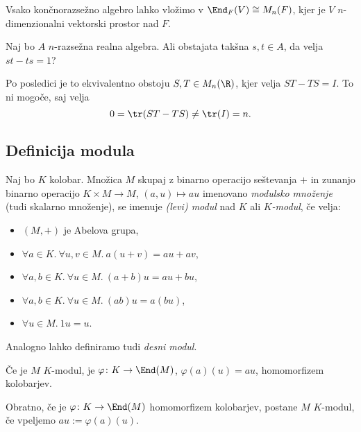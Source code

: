 \begin{posledica}
    Vsako končnorazsežno algebro lahko vložimo v $\End_F(V) \cong M_n(F)$, kjer 
    je $V$ $n$-dimenzionalni vektorski prostor nad $F$.
\end{posledica}

\begin{primer}
    Naj bo $A$ $n$-razsežna realna algebra. Ali obstajata takšna $s, t \in A$, da velja 
    $st - ts = 1$?

    Po posledici je to ekvivalentno obstoju $S, T \in M_n(\R)$, kjer velja $ST - TS = I$.
    To ni mogoče, saj velja
    \[
        0 = \tr(ST - TS) \neq \tr(I) = n.
    \]
\end{primer}

\subsection{Definicija modula}

\begin{definicija}
    Naj bo $K$ kolobar. Množica $M$ skupaj z binarno operacijo seštevanja $+$ in zunanjo
    binarno operacijo $K \times M \to M$, $(a, u) \mapsto au$ imenovano 
    \emph{modulsko množenje} (tudi skalarno množenje), 
    se imenuje \emph{(levi) modul} nad $K$ ali \emph{$K$-modul}, če velja:
    \begin{itemize}
        \item $(M, +)$ je Abelova grupa,
        \item $\forall a \in K.~\forall u, v \in M.~a(u+v)=au + av$,
        \item $\forall a, b \in K.~\forall u \in M.~(a+b)u = au + bu$,
        \item $\forall a, b \in K.~\forall u \in M.~(ab)u = a(bu)$,
        \item $\forall u \in M.~1u = u$.
    \end{itemize}   
\end{definicija}

\begin{opomba}
    Analogno lahko definiramo tudi \emph{desni modul}.
\end{opomba}

\begin{opomba}
    Če je $M$ $K$-modul, je $\varphi \colon K \to \End(M)$, $\varphi(a)(u) = au$, 
    homomorfizem kolobarjev.

    Obratno, če je $\varphi \colon K \to \End(M)$ homomorfizem kolobarjev, postane 
    $M$ $K$-modul, če vpeljemo $au := \varphi(a)(u)$.
\end{opomba}

